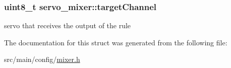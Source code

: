 \hypertarget{structservo__mixer_a67dc3ae6d3ebe59806a87c413cfb9f2b}{
\subsubsection[{target\+Channel}]{\setlength{\rightskip}{0pt plus 5cm}uint8\+\_\+t servo\+\_\+mixer\+::target\+Channel}}\label{structservo__mixer_a67dc3ae6d3ebe59806a87c413cfb9f2b}


servo that receives the output of the rule 



The documentation for this struct was generated from the following file\+:\begin{DoxyCompactItemize}
\item 
src/main/config/\hyperlink{config_2mixer_8h}{mixer.\+h}\end{DoxyCompactItemize}
